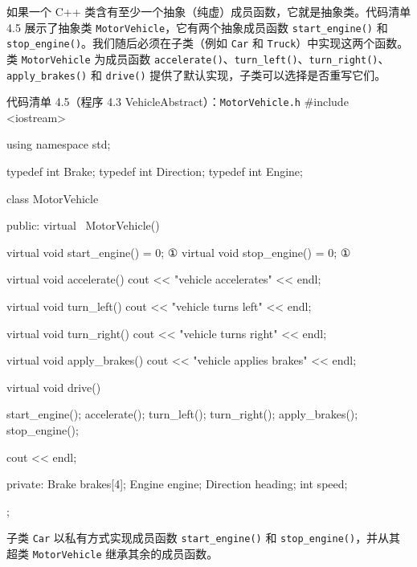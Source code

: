 如果一个 C++ 类含有至少一个抽象（纯虚）成员函数，它就是抽象类。代码清单 4.5 展示了抽象类 \texttt{Motor\allowbreak{}Vehicle}，它有两个抽象成员函数 \texttt{start\_\allowbreak{}engine(\allowbreak{})\allowbreak{}} 和 \texttt{stop\_\allowbreak{}engine(\allowbreak{})\allowbreak{}}。我们随后必须在子类（例如 \texttt{Car} 和 \texttt{Truck}）中实现这两个函数。类 \texttt{Motor\allowbreak{}Vehicle} 为成员函数 \texttt{accelerate(\allowbreak{})\allowbreak{}}、\texttt{turn\_\allowbreak{}left(\allowbreak{})\allowbreak{}}、\texttt{turn\_\allowbreak{}right(\allowbreak{})\allowbreak{}}、\texttt{apply\_\allowbreak{}brakes(\allowbreak{})\allowbreak{}} 和 \texttt{drive()} 提供了默认实现，子类可以选择是否重写它们。

\begin{codeboxt}{代码清单 4.5（程序 4.3 VehicleAbstract）：\texttt{Motor\allowbreak{}Vehicle.\allowbreak{}h}}
#include <iostream>

using namespace std;

typedef int Brake;
typedef int Direction;
typedef int Engine;

class MotorVehicle
{
public:
    virtual ~MotorVehicle() {}

    virtual void start_engine() = 0;     ①
    virtual void stop_engine() = 0;      ①

    virtual void accelerate()
    {
        cout << "vehicle accelerates" << endl;
    }

    virtual void turn_left()
    {
        cout << "vehicle turns left" << endl;
    }

    virtual void turn_right()
    {
        cout << "vehicle turns right" << endl;
    }

    virtual void apply_brakes()
    {
        cout << "vehicle applies brakes" << endl;
    }

    virtual void drive()
    {
        start_engine();
        accelerate();
        turn_left();
        turn_right();
        apply_brakes();
        stop_engine();

        cout << endl;
    }

private:
    Brake brakes[4];
    Engine engine;
    Direction heading;
    int speed;
};
\end{codeboxt}
\par

子类 \texttt{Car} 以私有方式实现成员函数 \texttt{start\_\allowbreak{}engine(\allowbreak{})\allowbreak{}} 和 \texttt{stop\_\allowbreak{}engine(\allowbreak{})\allowbreak{}}，并从其超类 \texttt{Motor\allowbreak{}Vehicle} 继承其余的成员函数。

